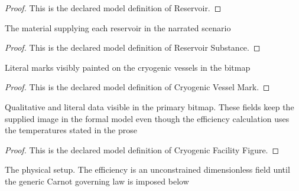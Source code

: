 \begin{proof}
  This is the declared model definition of Reservoir.
\end{proof}
\begin{definition}
  \label{def:physics:phyx-mini-0493:phyxminiproblems-problemphyxmini0493-reservoirsubstance}
  The material supplying each reservoir in the narrated scenario
\end{definition}
\begin{proof}
  This is the declared model definition of Reservoir Substance.
\end{proof}
\begin{definition}
  \label{def:physics:phyx-mini-0493:phyxminiproblems-problemphyxmini0493-cryogenicvesselmark}
  Literal marks visibly painted on the cryogenic vessels in the bitmap
\end{definition}
\begin{proof}
  This is the declared model definition of Cryogenic Vessel Mark.
\end{proof}
\begin{definition}
  \label{def:physics:phyx-mini-0493:phyxminiproblems-problemphyxmini0493-cryogenicfacilityfigure}
  Qualitative and literal data visible in the primary bitmap. These fields keep the supplied image in the formal model even though the efficiency calculation uses the temperatures stated in the prose
\end{definition}
\begin{proof}
  This is the declared model definition of Cryogenic Facility Figure.
\end{proof}
\begin{definition}
  \label{def:physics:phyx-mini-0493:phyxminiproblems-problemphyxmini0493-ambientnitrogencarnotsetup}
  The physical setup. The efficiency is an unconstrained dimensionless field until the generic Carnot governing law is imposed below
\end{definition}
